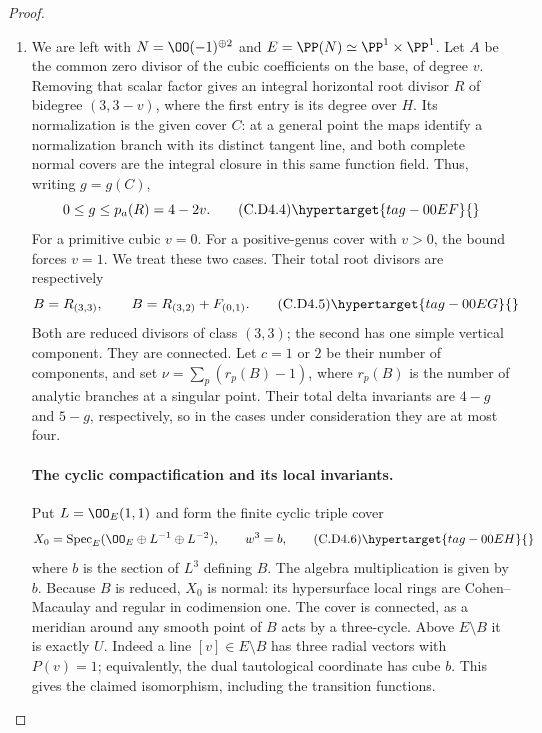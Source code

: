 \begin{proof}
\begin{enumerate}[label={$\langle1\rangle$\arabic*.},leftmargin=*]
\item We are left with $N=\OO(-1)^{\oplus2}$ and
$E=\PP(N)\simeq\PP^1\times\PP^1$. Let $A$ be the common
zero divisor of the cubic coefficients on the base, of degree
$v$. Removing that scalar factor gives an integral horizontal
root divisor $R$ of bidegree $(3,3-v)$, where the first entry
is its degree over $H$. Its normalization is the given
cover $C$: at a general point the maps identify a normalization
branch with its distinct tangent line, and both complete
normal covers are the integral closure in this same function
field. Thus, writing $g=g(C)$,
\[
                       0\le g\le p_a(R)=4-2v.
\tag{C.D4.4}\hypertarget{tag-00EF}{}\label{cdp:eq:C.D4.4}
\]
For a primitive cubic $v=0$. For a positive-genus cover with
$v>0$, the bound forces $v=1$. We treat these two cases.
Their total root divisors are respectively
\[
 B=R_{(3,3)},\qquad
 B=R_{(3,2)}+F_{(0,1)}.
\tag{C.D4.5}\hypertarget{tag-00EG}{}\label{cdp:eq:C.D4.5}
\]
Both are reduced divisors of class $(3,3)$; the second has
one simple vertical component. They are connected. Let
$c=1$ or $2$ be their number of components, and set
$\nu=\sum_p(r_p(B)-1)$, where $r_p(B)$ is the number of
analytic branches at a singular point. Their total delta
invariants are $4-g$ and $5-g$, respectively, so in the
cases under consideration they are at most four.

\paragraph{The cyclic compactification and its local invariants.}
Put $L=\OO_E(1,1)$ and form the finite cyclic triple cover
\[
 X_0=\operatorname{Spec}_E
       (\OO_E\oplus L^{-1}\oplus L^{-2}),\qquad w^3=b,
\tag{C.D4.6}\hypertarget{tag-00EH}{}\label{cdp:eq:C.D4.6}
\]
where $b$ is the section of $L^3$ defining $B$. The algebra
multiplication is given by $b$. Because $B$ is reduced,
$X_0$ is normal: its hypersurface local rings are Cohen--Macaulay
and regular in codimension one. The cover is connected,
as a meridian around any smooth point of $B$ acts by a
three-cycle. Above $E\setminus B$ it is exactly $U$.
Indeed a line $[v]\in E\setminus B$ has three radial vectors
with $P(v)=1$; equivalently, the dual tautological coordinate
has cube $b$. This gives the claimed isomorphism, including
the transition functions.


\end{enumerate}
\end{proof}
